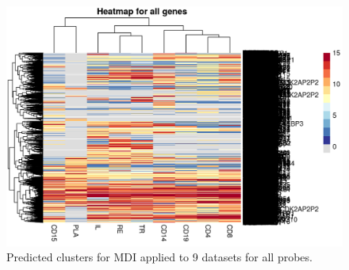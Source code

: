 \documentclass[12pt]{article} %
\begin{document}
	\begin{figure}[h]
	\includegraphics[scale=1.0]{Images/Initial_analysis/mdi_2_heatmap-1.png}
	\caption{Predicted clusters for MDI applied to 9 datasets for all probes.}
	\label{fig:naive_mdi_full}
\end{figure}
	
	\newpage



	
	
	
\end{document}
